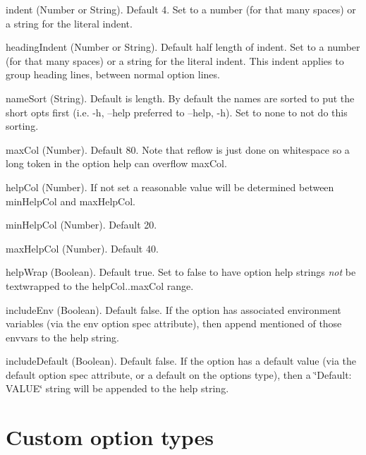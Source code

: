 \begin{DoxyItemize}
\item {\ttfamily indent} (Number or String). Default 4. Set to a number (for that many spaces) or a string for the literal indent.
\item {\ttfamily heading\+Indent} (Number or String). Default half length of {\ttfamily indent}. Set to a number (for that many spaces) or a string for the literal indent. This indent applies to group heading lines, between normal option lines.
\item {\ttfamily name\+Sort} (String). Default is \textquotesingle{}length\textquotesingle{}. By default the names are sorted to put the short opts first (i.\+e. \textquotesingle{}-\/h, --help\textquotesingle{} preferred to \textquotesingle{}--help, -\/h\textquotesingle{}). Set to \textquotesingle{}none\textquotesingle{} to not do this sorting.
\item {\ttfamily max\+Col} (Number). Default 80. Note that reflow is just done on whitespace so a long token in the option help can overflow max\+Col.
\item {\ttfamily help\+Col} (Number). If not set a reasonable value will be determined between {\ttfamily min\+Help\+Col} and {\ttfamily max\+Help\+Col}.
\item {\ttfamily min\+Help\+Col} (Number). Default 20.
\item {\ttfamily max\+Help\+Col} (Number). Default 40.
\item {\ttfamily help\+Wrap} (Boolean). Default true. Set to {\ttfamily false} to have option {\ttfamily help} strings {\itshape not} be textwrapped to the help\+Col..max\+Col range.
\item {\ttfamily include\+Env} (Boolean). Default false. If the option has associated environment variables (via the {\ttfamily env} option spec attribute), then append mentioned of those envvars to the help string.
\item {\ttfamily include\+Default} (Boolean). Default false. If the option has a default value (via the {\ttfamily default} option spec attribute, or a default on the option\textquotesingle{}s type), then a \char`\"{}\+Default\+: V\+A\+L\+U\+E\char`\"{} string will be appended to the help string.
\end{DoxyItemize}

\section*{Custom option types}

